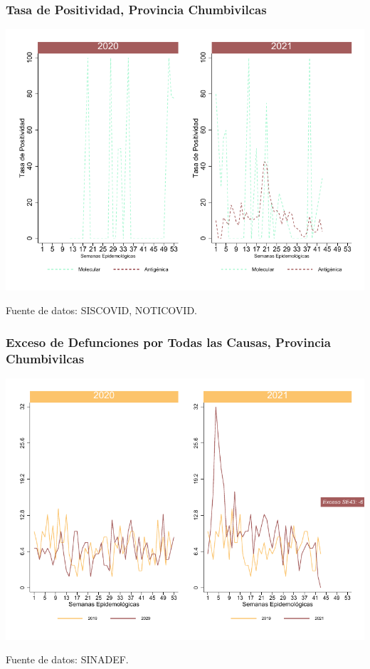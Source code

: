 \documentclass[xcolor=table]{beamer}
\begin{document}
\begin{frame}
	\frametitle{Tasa de Positividad, Provincia Chumbivilcas}
	\vspace{-.5cm}
	\begin{center}
		\includegraphics[width=0.8\linewidth, trim={0cm .5cm 0cm 0.2cm},clip]{../figuras/positividad_20_21_6.pdf}
	\end{center}
	{\tiny Fuente de datos: SISCOVID, NOTICOVID.}
\end{frame}

\begin{frame}
	\frametitle{Exceso de Defunciones por Todas las Causas, Provincia Chumbivilcas}
	\vspace{-.5cm}
	\begin{center}
		\includegraphics[width=0.8\linewidth, trim={0cm .5cm 0cm 0.2cm},clip]{../figuras/exceso_6.pdf}
	\end{center}
	{\tiny Fuente de datos: SINADEF.}
	
	\hyperlink{indicadores_provinciales}{}
\end{frame}
\end{document}
